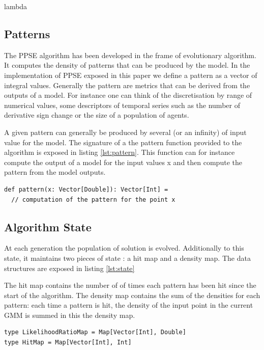 \documentclass[10pt,a4paper]{article}
\theoremstyle{definition}
\theoremstyle{remark}
\begin{document}
lambda

\subsection{Patterns}

The PPSE algorithm has been developed in the frame of evolutionary algorithm. It computes the density of patterns that can be produced by the model. In the implementation of PPSE exposed in this paper we define a pattern as a vector of integral values. Generally the pattern are metrics that can be derived from the outputs of a model. For instance one can think of the discretisation by range of numerical values, some descriptors of temporal series such as the number of derivative sign change or the size of a population of agents. 

A given pattern can generally be produced by several (or an infinity) of input value for the model. The signature of a the pattern function provided to the algorithm is exposed in listing \ref{lst:pattern}. This function can for instance compute the output of a model for the input values x and then compute the pattern from the model outputs.

\begin{lstlisting}[caption={Pattern function},label={lst:pattern}]
def pattern(x: Vector[Double]): Vector[Int] = 
  // computation of the pattern for the point x
\end{lstlisting}


\subsection{Algorithm State}\label{sec. algoState}

At each generation the population of solution is evolved. Additionally to this state, it maintains two pieces of state : a hit map and a density map. The data structures are exposed in listing \ref{lst:state}

The hit map contains the number of of times each pattern has been hit since the start of the algorithm. The density map contains the sum of the densities for each pattern: each time a pattern is hit, the density of the input point in the current GMM is summed in this the density map. 

\begin{lstlisting}[caption={State},label={lst:state}]
type LikelihoodRatioMap = Map[Vector[Int], Double]
type HitMap = Map[Vector[Int], Int]
\end{lstlisting}
\end{document}

